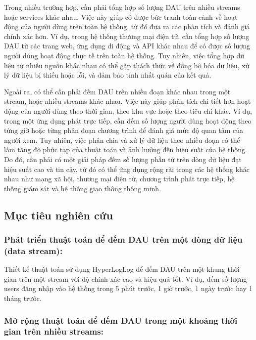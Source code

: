 \documentclass[a4paper,13pt]{article}
\theoremstyle{mytheor}
\begin{document}
Trong nhiều trường hợp, cần phải tổng hợp số lượng DAU trên nhiều streams hoặc services khác nhau. Việc này giúp có được bức tranh toàn cảnh về hoạt động của người dùng trên toàn hệ thống, từ đó đưa ra các phân tích và đánh giá chính xác hơn. Ví dụ, trong hệ thống thương mại điện tử, cần tổng hợp số lượng DAU từ các trang web, ứng dụng di động và API khác nhau để có được số lượng người dùng hoạt động thực tế trên toàn hệ thống. Tuy nhiên, việc tổng hợp dữ liệu từ nhiều nguồn khác nhau có thể gặp thách thức về đồng bộ hóa dữ liệu, xử lý dữ liệu bị thiếu hoặc lỗi, và đảm bảo tính nhất quán của kết quả. 

Ngoài ra, có thể cần phải đếm DAU trên nhiều đoạn khác nhau trong một stream, hoặc nhiều streams khác nhau. Việc này giúp phân tích chi tiết hơn hoạt động của người dùng theo thời gian, theo khu vực hoặc theo tiêu chí khác. Ví dụ, trong một ứng dụng phát trực tiếp, cần đếm số lượng người dùng hoạt động theo từng giờ hoặc từng phân đoạn chương trình để đánh giá mức độ quan tâm của người xem. Tuy nhiên, việc phân chia và xử lý dữ liệu theo nhiều đoạn có thể làm tăng độ phức tạp của thuật toán và ảnh hưởng đến hiệu suất của hệ thống. Do đó, cần phải có một giải pháp đếm số lượng phần tử trên dòng dữ liệu đạt hiệu suất cao và tin cậy, từ đó có thể ứng dụng rộng rãi trong các hệ thống khác nhau như mạng xã hội, thương mại điện tử, chương trình phát trực tiếp, hệ thống giám sát và hệ thống giao thông thông minh.

\subsection{Mục tiêu nghiên cứu }
\subsubsection{Phát triển thuật toán để đếm DAU trên một dòng dữ liệu (data stream):}
Thiết kế thuật toán sử dụng HyperLogLog để đếm DAU trên một khung thời gian trên một stream với độ chính xác cao và hiệu quả tốt. Ví dụ, đếm số lượng users đăng nhập vào hệ thống trong 5 phút trước, 1 giờ trước, 1 ngày trước hay 1 tháng trước.
\subsubsection{Mở rộng thuật toán để đếm DAU trong một khoảng thời gian trên nhiều streams:}
\end{document}
